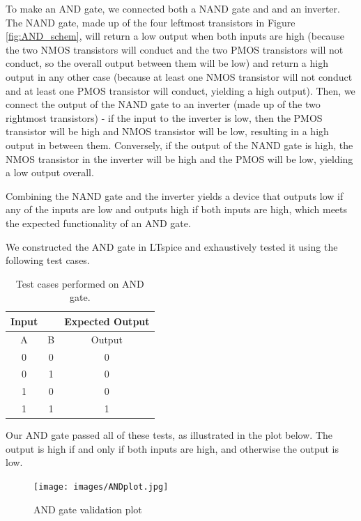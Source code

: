\documentclass{article}
\begin{document}
To make an AND gate, we connected both a NAND gate and and an inverter. The NAND gate, made up of the four leftmost transistors in Figure \ref{fig:AND_schem}, will return a low output when both inputs are high (because the two NMOS transistors will conduct and the two PMOS transistors will not conduct, so the overall output between them will be low) and return a high output in any other case (because at least one NMOS transistor will not conduct and at least one PMOS transistor will conduct, yielding a high output). Then, we connect the output of the NAND gate to an inverter (made up of the two rightmost transistors) - if the input to the inverter is low, then the PMOS transistor will be high and NMOS transistor will be low, resulting in a high output in between them. Conversely, if the output of the NAND gate is high, the NMOS transistor in the inverter will be high and the PMOS will be low, yielding a low output overall.

Combining the NAND gate and the inverter yields a device that outputs low if any of the inputs are low and outputs high if both inputs are high, which meets the expected functionality of an AND gate. 

We constructed the AND gate in LTspice and exhaustively tested it using the following test cases.
\begin{table}[h]
\begin{center}
 \begin{tabular}{|c c | c |} 
 \hline  
 Input &  & Expected Output \\
 \hline
 A & B & Output\\ 
 \hline
 0 & 0 & 0 \\ 
 \hline
 0 & 1 & 0 \\ 
 \hline
 1 & 0 & 0 \\ 
 \hline
 1 & 1 & 1 \\ 
 \hline
\end{tabular}
\caption{Test cases performed on AND gate.}
\end{center}
\end{table}

Our AND gate passed all of these tests, as illustrated in the plot below. The output is high if and only if both inputs are high, and otherwise the output is low. 

\begin{figure}[H]
  \begin{center}      
  \texttt{[image: images/ANDplot.jpg]}
  \caption{AND gate validation plot}   
  \label{fig:ANDplot}
  \end{center}
\end{figure}
\end{document}
